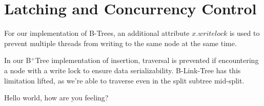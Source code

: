 \section{Latching and Concurrency Control}

For our implementation of B-Trees, an additional attribute $x.writelock$ is used to prevent multiple threads from writing to the same node at the same time.

In our B$^+$Tree implementation of insertion, traversal is prevented if encountering a node with a write lock to ensure data serializability. B-Link-Tree has this limitation lifted, as we're able to traverse even in the split subtree mid-split.

Hello world, how are you feeling?